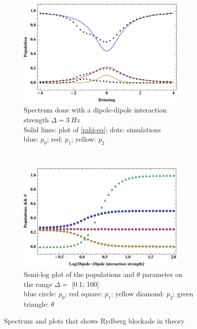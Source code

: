\documentclass[twoside, open=right
]{scrreprt}
\begin{document}
\begin{figure}[h]
  \centering
  \begin{subfigure}[b]{0.5\textwidth}
  \includegraphics[width=0.9\textwidth]{blockade-sp.pdf}
  \caption{\label{theta-sp}Spectrum done with a dipole-dipole interaction strength $\Delta = \SI{3}{Hz}$ \\ Solid lines: plot of \cref{rabi-eq}; dots: simulations \\ blue: $p_0$; red: $p_1$; yellow: $p_2$}
  \end{subfigure}
  ~
  \begin{subfigure}[b]{0.5\textwidth}
  \includegraphics[width=0.9\textwidth]{blockade-semilog.pdf}
  \caption{\label{theta-log}Semi-log plot of the populations and $\theta$ parameter on the range $\Delta =$ [0.1; 100] \\ blue circle: $p_0$; red square: $p_1$; yellow diamond: $p_2$; green triangle: $\theta$}
  \end{subfigure}

  \caption{\label{theta-plots} Spectrum and plots that shows Rydberg blockade in theory}
\end{figure}
\end{document}
